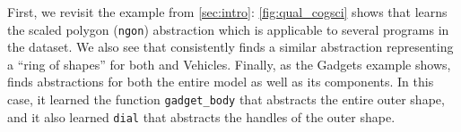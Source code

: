 First, we revisit the \nuts example
  from \autoref{sec:intro}:
  \autoref{fig:qual_cogsci} shows that \tool %
  learns the scaled polygon (\texttt{ngon}) abstraction which
  is applicable to several programs in the dataset.
We also see that \tool consistently
  finds a similar abstraction
  representing a ``ring of shapes'' for both
  \nuts and Vehicles.
Finally, as the Gadgets example shows,
  \tool finds abstractions for both
  the entire model as well as its components.
In this case,
  it learned the function \texttt{gadget\_body}
  that abstracts the entire outer shape,
  and it also learned \texttt{dial} that abstracts
  the handles of the outer shape.

